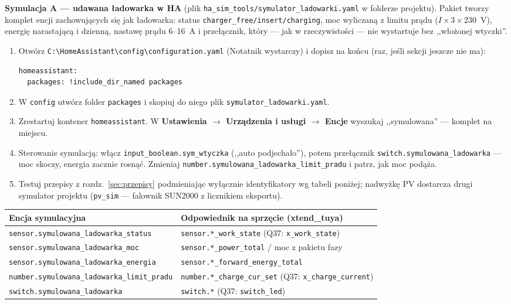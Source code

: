 \documentclass[11pt,a4paper]{article}
\begin{document}
\textbf{Symulacja A --- udawana ładowarka w HA} (plik \texttt{ha\_sim\_tools/symulator\_ladowarki.yaml} w folderze projektu). Pakiet tworzy komplet encji zachowujących się jak ładowarka: status \texttt{charger\_free/insert/charging}, moc wyliczaną z limitu prądu ($I \times 3 \times 230$~V), energię narastającą i dzienną, nastawę prądu 6--16~A i przełącznik, który --- jak w rzeczywistości --- nie wystartuje bez ,,włożonej wtyczki''.

\begin{enumerate}
\item Otwórz \texttt{C:\textbackslash HomeAssistant\textbackslash config\textbackslash configuration.yaml} (Notatnik wystarczy) i dopisz na końcu (raz, jeśli sekcji jeszcze nie ma):
\begin{lstlisting}
homeassistant:
  packages: !include_dir_named packages
\end{lstlisting}
\item W \texttt{config} utwórz folder \texttt{packages} i skopiuj do niego plik \texttt{symulator\_ladowarki.yaml}.
\item Zrestartuj kontener \texttt{homeassistant}. W \textbf{Ustawienia $\to$ Urządzenia i usługi $\to$ Encje} wyszukaj ,,symulowana'' --- komplet na miejscu.
\item Sterowanie symulacją: włącz \texttt{input\_boolean.sym\_wtyczka} (,,auto podjechało''), potem przełącznik \texttt{switch.symulowana\_ladowarka} --- moc skoczy, energia zacznie rosnąć. Zmieniaj \texttt{number.symulowana\_ladowarka\_limit\_pradu} i patrz, jak moc podąża.
\item Testuj przepisy z rozdz.~\ref{sec:przepisy} podmieniając wyłącznie identyfikatory wg tabeli poniżej; nadwyżkę PV dostarcza drugi symulator projektu (\texttt{pv\_sim} --- falownik SUN2000 z licznikiem eksportu).
\end{enumerate}

\begin{center}
\footnotesize
\begin{tabular}{>{\raggedright\arraybackslash}p{7.1cm} >{\raggedright\arraybackslash}p{6.9cm}}
\toprule
\textbf{Encja symulacyjna} & \textbf{Odpowiednik na sprzęcie (xtend\_tuya)}\\
\midrule
\texttt{sensor.symulowana\_ladowarka\_status} & \texttt{sensor.*\_work\_state} (Q37: \texttt{x\_work\_state})\\
\texttt{sensor.symulowana\_ladowarka\_moc} & \texttt{sensor.*\_power\_total} / moc z pakietu fazy\\
\texttt{sensor.symulowana\_ladowarka\_energia} & \texttt{sensor.*\_forward\_energy\_total}\\
\texttt{number.symulowana\_ladowarka\-\_limit\_pradu} & \texttt{number.*\_charge\_cur\_set} (Q37: \texttt{x\_charge\_current})\\
\texttt{switch.symulowana\_ladowarka} & \texttt{switch.*} (Q37: \texttt{switch\_led})\\
\bottomrule
\end{tabular}
\end{center}
\end{document}
